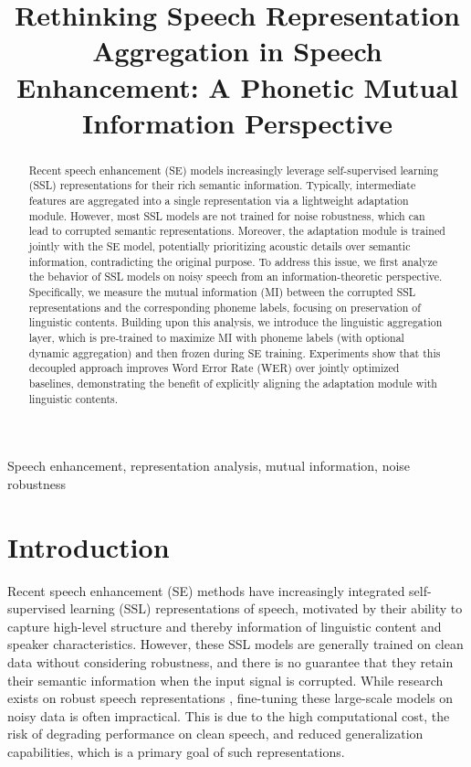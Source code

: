 \documentclass{article}
\title{Rethinking Speech Representation Aggregation in Speech Enhancement: A Phonetic Mutual Information Perspective}
\begin{document}
\ninept
%
\maketitle
%
\begin{abstract}
Recent speech enhancement (SE) models increasingly leverage self-supervised learning (SSL) representations for their rich semantic information. Typically, intermediate features are aggregated into a single representation via a lightweight adaptation module. However, most SSL models are not trained for noise robustness, which can lead to corrupted semantic representations. Moreover, the adaptation module is trained jointly with the SE model, potentially prioritizing acoustic details over semantic information, contradicting the original purpose.
To address this issue, we first analyze the behavior of SSL models on noisy speech from an information-theoretic perspective. Specifically, we measure the mutual information (MI) between the corrupted SSL representations and the corresponding phoneme labels,  focusing on preservation of linguistic contents.  
Building upon this analysis, we introduce the linguistic aggregation layer, which is pre-trained to maximize MI with phoneme labels (with optional dynamic aggregation) and then frozen during SE training. 
Experiments show that this decoupled approach improves Word Error Rate (WER) over jointly optimized baselines, demonstrating the benefit of explicitly aligning the adaptation module with linguistic contents.
\end{abstract}
%
\begin{keywords}
Speech enhancement, representation analysis, mutual information, noise robustness
\end{keywords}
%

\section{Introduction}
\label{sec:intro}
Recent speech enhancement (SE) methods \cite{wsum_eval, wsum_acoustic_se, finally, genhancer, ditse} have increasingly integrated self-supervised learning (SSL) representations of speech, motivated by their ability to capture high-level structure and thereby information of linguistic content and speaker characteristics. However, these SSL models are generally trained on clean data without considering robustness, and there is no guarantee that they retain their semantic information when the input signal is corrupted. 
While research exists on robust speech representations \cite{robustdata2vec, robustdistiller, dehubert}, fine-tuning these large-scale models on noisy data is often impractical. This is due to the high computational cost, the risk of degrading performance on clean speech, and reduced generalization capabilities, which is a primary goal of such representations.
\end{document}
